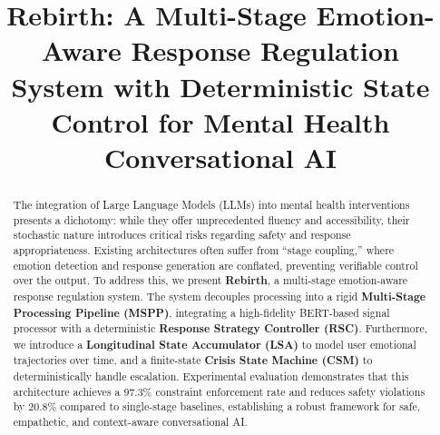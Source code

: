 \documentclass[conference]{IEEEtran}
\begin{document}
\title{Rebirth: A Multi-Stage Emotion-Aware Response Regulation System with Deterministic State Control for Mental Health Conversational AI}

\author{
\and
{}
\and
{}
}

\maketitle

\begin{abstract}
The integration of Large Language Models (LLMs) into mental health interventions presents a dichotomy: while they offer unprecedented fluency and accessibility, their stochastic nature introduces critical risks regarding safety and response appropriateness. Existing architectures often suffer from ``stage coupling,'' where emotion detection and response generation are conflated, preventing verifiable control over the output. To address this, we present \textbf{Rebirth}, a multi-stage emotion-aware response regulation system. The system decouples processing into a rigid \textbf{Multi-Stage Processing Pipeline (MSPP)}, integrating a high-fidelity BERT-based signal processor with a deterministic \textbf{Response Strategy Controller (RSC)}. Furthermore, we introduce a \textbf{Longitudinal State Accumulator (LSA)} to model user emotional trajectories over time, and a finite-state \textbf{Crisis State Machine (CSM)} to deterministically handle escalation. Experimental evaluation demonstrates that this architecture achieves a 97.3\% constraint enforcement rate and reduces safety violations by 20.8\% compared to single-stage baselines, establishing a robust framework for safe, empathetic, and context-aware conversational AI.
\end{abstract}
\end{document}
